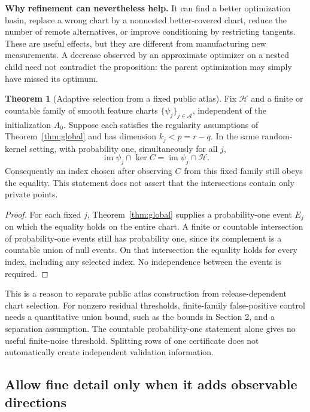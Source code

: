 \documentclass[11pt,a4paper]{article}
\theoremstyle{definition}
\newtheorem{theorem}{Theorem}[section]
\theoremstyle{definition}
\theoremstyle{remark}\newtheorem{remark}[theorem]{Remark}
\newcommand{\HH}{\mathcal H}\newcommand{\XX}{\mathcal X}\newcommand{\col}{\operatorname{col}}
\newcommand{\im}{\operatorname{im}}\newcommand{\dist}{\operatorname{dist}}
\begin{document}
\textbf{Why refinement can nevertheless help.} It can find a better optimization basin, replace a wrong chart by a nonnested better-covered chart, reduce the number of remote alternatives, or improve conditioning by restricting tangents. These are useful effects, but they are different from manufacturing new measurements. A decrease observed by an approximate optimizer on a nested child need not contradict the proposition: the parent optimization may simply have missed its optimum.

\begin{theorem}[Adaptive selection from a fixed public atlas]\label{thm:fixedatlas}
Fix $\HH$ and a finite or countable family of smooth feature charts $\{\psi_j\}_{j\in\mathcal A}$, independent of the initialization $A_0$. Suppose each satisfies the regularity assumptions of Theorem~\ref{thm:global} and has dimension $k_j<p=r-q$. In the same random-kernel setting, with probability one, simultaneously for all $j$,
\[
\im\psi_j\cap\ker C=\im\psi_j\cap\HH.
\]
Consequently an index chosen after observing $C$ from this fixed family still obeys the equality. This statement does not assert that the intersections contain only private points.
\end{theorem}
\begin{proof}
For each fixed $j$, Theorem~\ref{thm:global} supplies a probability-one event $E_j$ on which the equality holds on the entire chart. A finite or countable intersection of probability-one events still has probability one, since its complement is a countable union of null events. On that intersection the equality holds for every index, including any selected index. No independence between the events is required.
\end{proof}

This is a reason to separate public atlas construction from release-dependent chart selection. For nonzero residual thresholds, finite-family false-positive control needs a quantitative union bound, such as the bounds in Section 2, and a separation assumption. The countable probability-one statement alone gives no useful finite-noise threshold. Splitting rows of one certificate does not automatically create independent validation information.

\subsection{Allow fine detail only when it adds observable directions}
\end{document}

